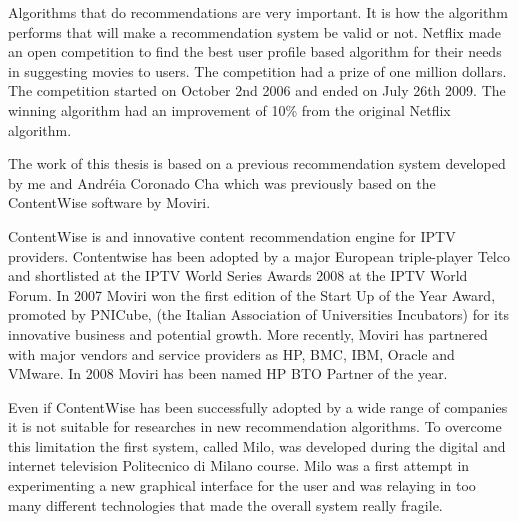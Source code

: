 Algorithms that do recommendations are very important. It is how the algorithm performs that will make a recommendation system be valid or not. Netflix made an open competition \cite{netflixprize} to find the best user profile based algorithm for their needs in suggesting movies to users. The competition had a prize of one million dollars. The competition started on October 2nd 2006 and ended on July 26th 2009. The winning algorithm had an improvement of 10\% from the original Netflix algorithm. 

The work of this thesis is based on a previous recommendation system developed by me and Andr\'eia Coronado Cha which was previously based on the ContentWise \cite{ContentWise} software by Moviri. 

ContentWise is and innovative content recommendation engine for IPTV providers. Contentwise has been adopted by a major European triple-player Telco and shortlisted at the IPTV World Series Awards 2008 at the IPTV World Forum.
In 2007 Moviri won the first edition of the Start Up of the Year Award, promoted by PNICube, (the Italian Association of Universities Incubators) for its innovative business and potential growth. More recently, Moviri has partnered with major vendors and service providers as HP, BMC, IBM, Oracle and VMware. In 2008 Moviri has been named HP BTO Partner of the year.     

Even if ContentWise has been successfully adopted by a wide range of companies it is not suitable for researches in new recommendation algorithms. To overcome this limitation the first system, called Milo, was developed during the digital and internet television Politecnico di Milano course. Milo was a first attempt in experimenting a new graphical interface for the user and was relaying in too many different technologies that made the overall system really fragile.

